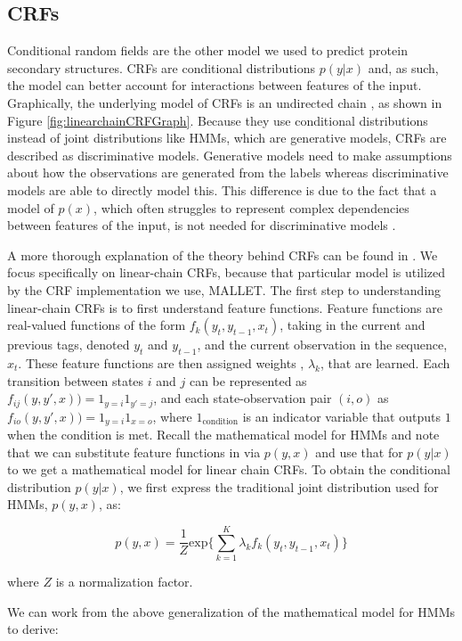 \documentclass[11 pt, twocolumn]{article}
\begin{document}
\subsection{CRFs}
Conditional random fields are the other model we used to predict protein secondary structures. CRFs are conditional distributions $p(y|x)$ and, as such, the model can better account for interactions
between features of the input. Graphically, the underlying model of CRFs is an undirected chain \cite{Sutton}, as shown in Figure \ref{fig:linearchainCRFGraph}. Because they use conditional distributions instead of joint distributions like HMMs, which are generative models,
CRFs are described as discriminative models. Generative models need to make assumptions about how the observations are generated from the labels whereas discriminative models are able to directly model this\cite{Lukov}. This difference is due to the fact that a model
of $p(x)$, which often struggles to represent complex dependencies between features of the input, is not needed for discriminative models \cite{Sutton}. 

A more thorough explanation of the theory behind CRFs can be found in \cite{Sutton}. We focus specifically on linear-chain CRFs, because that particular model is utilized by the CRF implementation we use, MALLET.  The first step to understanding linear-chain CRFs is to first understand feature functions. Feature functions are real-valued functions of the form $f_k(y_t, y_{t-1}, x_t)$, taking in the current and previous tags, denoted $y_t$ and  $y_{t-1}$, and the current observation in the sequence, $x_t$.  These feature functions are then assigned weights , $\lambda_k$, that are learned. Each transition between states $i$ and $j$ can be represented as $f_{ij}(y, y\prime, x)) = 1_{y=i}1_{y\prime=j}$, and each state-observation pair $(i,o)$ as 
$f_{io}(y, y\prime, x)) = 1_{y=i}1_{x=o}$, where $1_{\text{condition}}$ is an indicator variable that outputs $1$ when the condition is met. Recall the mathematical model for HMMs and note that we can substitute feature functions in via $p(y,x)$ and use that for $p(y|x)$ to we get a mathematical model for linear chain CRFs.  To obtain the conditional distribution $p(y|x)$, we first express the traditional joint distribution used for HMMs, $p(y,x)$, as:

$$p(y,x) = \frac{1}{Z}\text{exp}\{\sum_{k=1}^{K}\lambda_k f_k (y_t, y_{t-1}, x_t)\}$$

where $Z$ is a normalization factor.

We can work from the above generalization of the mathematical model for HMMs to derive:
\end{document}
